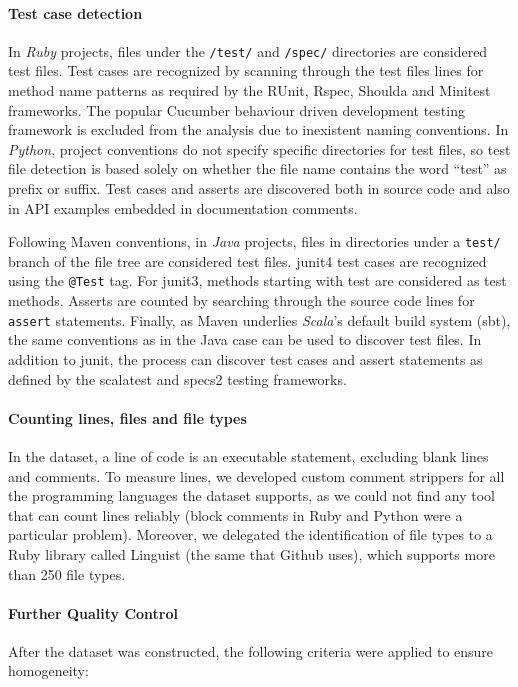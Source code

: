 \documentclass{sig-alternate}
\begin{document}
\paragraph*{Test case detection}
In \emph{Ruby} projects, files under the \texttt{/test/} and \texttt{/spec/}
directories are considered test files. Test cases are recognized by scanning
through the test files lines for method name patterns as required by the
\textsf{RUnit}, \textsf{Rspec}, \textsf{Shoulda} and \textsf{Minitest}
frameworks. The popular Cucumber behaviour driven development testing framework
is excluded from the analysis due to inexistent naming conventions.  In
\emph{Python}, project conventions do not specify specific directories for test
files, so test file detection is based solely on whether the file name contains
the word ``test'' as prefix or suffix. Test cases and asserts are discovered
both in source code and also in API examples embedded in documentation comments.

Following Maven conventions, in \emph{Java} projects, files in directories under
a \texttt{test/} branch of the file tree are considered test files.
\textsf{junit4} test cases are recognized using the \texttt{@Test} tag. For
\textsf{junit3}, methods starting with test are considered as test methods.
Asserts are counted by searching through the source code lines for
\texttt{assert} statements. Finally, as Maven underlies \emph{Scala}'s default
build system (\textsf{sbt}), the same conventions as in the Java case can be
used to discover test files. In addition to \textsf{junit}, the process can
discover test cases and assert statements as defined by the \textsf{scalatest}
and \textsf{specs2} testing frameworks.


\paragraph*{Counting lines, files and file types}

In the \pullreqs dataset, a line of code is an executable statement,
excluding blank lines and comments. To measure lines, we developed custom
comment strippers for all the programming languages the dataset supports, as
we could not find any tool that can count lines reliably (block comments in Ruby and Python were a particular problem).
Moreover, we delegated the identification of file types to a Ruby library
called Linguist (the same that Github uses), which supports more than 250 file types.

\paragraph*{Further Quality Control}
After the dataset was constructed, the following criteria were applied to 
ensure homogeneity:
\end{document}
